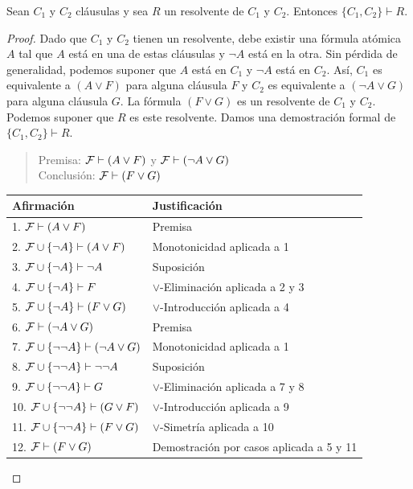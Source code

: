 \message{ !name(main.tex)}\documentclass[12pt,a4paper]{book}
\makeatletter
\newenvironment{derivacion}{%
  \begingroup
  \renewcommand{\arraystretch}{1.35}
  \begin{center}
  \begin{tabular}{@{}l l@{}}
    \textbf{Afirmación} & \textbf{Justificación}\\
    \hline
}{%
  \end{tabular}
  \end{center}
  \endgroup
}
\makeatother
\begin{document}
    \begin{proposicion}\label{prop:resolvente-deducible}
        Sean $C_{1}$ y $C_{2}$ cláusulas y sea $R$ un resolvente de $C_{1}$ y $C_{2}$. Entonces $\{C_{1},C_{2}\}\vdash R$.
    \end{proposicion}
    \begin{proof}
        Dado que $C_{1}$ y $C_{2}$ tienen un resolvente, debe existir una fórmula atómica $A$ tal que $A$ está en una de
        estas cláusulas y $\neg A$ está en la otra. Sin pérdida de generalidad, podemos suponer que $A$ está en $C_{1}$ y
        $\neg A$ está en $C_{2}$. Así, $C_{1}$ es equivalente a $(A\vee F)$ para alguna cláusula $F$ y $C_{2}$ es equivalente
        a $(\neg A\vee G)$ para alguna cláusula $G$. La fórmula $(F\vee G)$ es un resolvente de $C_{1}$ y $C_{2}$. Podemos
        suponer que $R$ es este resolvente. Damos una demostración formal de $\{C_{1},C_{2}\}\vdash R$.

        \begin{quote}
            Premisa: $\mathcal{F}\vdash(A\vee F)$ y $\mathcal{F}\vdash(\neg A\vee G)$\\
            Conclusión: $\mathcal{F}\vdash(F\vee G)$
        \end{quote}

        \begin{derivacion}
            1. $\mathcal{F}\vdash(A\vee F)$ & Premisa\\
            2. $\mathcal{F}\cup\{\neg A\}\vdash(A\vee F)$ & Monotonicidad aplicada a 1\\
            3. $\mathcal{F}\cup\{\neg A\}\vdash\neg A$ & Suposición\\
            4. $\mathcal{F}\cup\{\neg A\}\vdash F$ & $\vee$-Eliminación aplicada a 2 y 3\\
            5. $\mathcal{F}\cup\{\neg A\}\vdash(F\vee G)$ & $\vee$-Introducción aplicada a 4\\
            6. $\mathcal{F}\vdash(\neg A\vee G)$ & Premisa\\
            7. $\mathcal{F}\cup\{\neg\neg A\}\vdash(\neg A\vee G)$ & Monotonicidad aplicada a 1\\
            8. $\mathcal{F}\cup\{\neg\neg A\}\vdash\neg\neg A$ & Suposición\\
            9. $\mathcal{F}\cup\{\neg\neg A\}\vdash G$ & $\vee$-Eliminación aplicada a 7 y 8\\
            10. $\mathcal{F}\cup\{\neg\neg A\}\vdash(G\vee F)$ & $\vee$-Introducción aplicada a 9\\
            11. $\mathcal{F}\cup\{\neg\neg A\}\vdash(F\vee G)$ & $\vee$-Simetría aplicada a 10\\
            12. $\mathcal{F}\vdash(F\vee G)$ & Demostración por casos aplicada a 5 y 11\\
        \end{derivacion}
    \end{proof}
\end{document}
